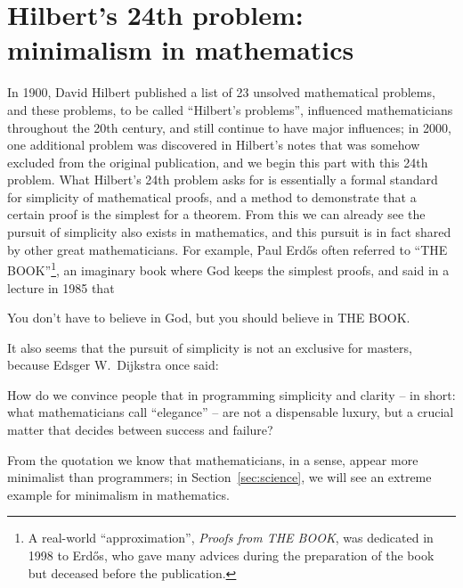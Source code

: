 \newpart
\section{Hilbert's 24th problem: minimalism in mathematics}\label{sec:hilbert}

In 1900, David Hilbert published a list of 23 unsolved mathematical
problems, and these problems, to be called ``Hilbert's problems'', influenced
mathematicians throughout the 20th century, and still continue to have major
influences; in 2000, one additional problem was discovered in Hilbert's notes
that was somehow excluded from the original publication, and we begin this part
with this 24th problem.  What Hilbert's 24th problem
asks for is essentially a formal standard for simplicity of mathematical proofs,
and a method to demonstrate that a certain proof is the simplest for a theorem.
From this we can already see the pursuit of simplicity also exists in
mathematics, and this pursuit is in fact shared by other great mathematicians.
For example, Paul Erdős often referred to ``THE BOOK''\footnote{A real-world
``approximation'', \emph{Proofs from THE BOOK}, was
dedicated in 1998 to Erdős, who gave many advices during the preparation
of the book but deceased before the publication.}, an imaginary book where
God keeps the simplest proofs, and said in a lecture in 1985 that
\begin{quoting}
	You don't have to believe in God, but you should believe in THE BOOK.
\end{quoting}
It also seems that the pursuit of simplicity is not an exclusive
for masters, because Edsger W.\ Dijkstra once said:
\begin{quoting}
	How do we convince people that in programming simplicity and clarity --
	in short: what mathematicians call ``elegance'' -- are not a dispensable
	luxury, but a crucial matter that decides between success and failure?
\end{quoting}
From the quotation we know that mathematicians, in a sense, appear more
minimalist than programmers; in Section~\ref{sec:science}, we will
see an extreme example for minimalism in mathematics.

